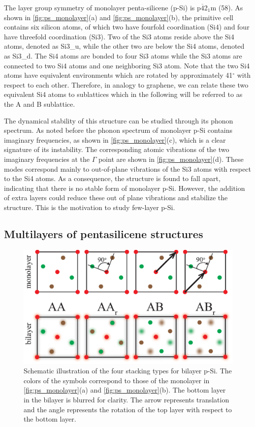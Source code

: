 The layer group symmetry of monolayer penta-silicene (p-Si) is p$\overline{4}$2$_1$m (58). As shown in \autoref{fig:ps_monolayer}(a) and \autoref{fig:ps_monolayer}(b), the primitive cell contains six silicon atoms, of which two have fourfold coordination (Si4) and four have threefold coordination (Si3). Two of the Si3 atoms reside above the Si4 atoms, denoted as Si3\_u, while the other two are below the Si4 atoms, denoted as Si3\_d. The Si4 atoms are bonded to four Si3 atoms while the Si3 atoms are connected to two Si4 atoms and one neighboring Si3 atom. Note that the two Si4 atoms have equivalent environments which are rotated by approximately 41$^{\circ}$ with respect to each other. Therefore, in analogy to graphene, we can relate these two equivalent Si4 atoms to sublattices which in the following will be referred to as the A and B sublattice.

The dynamical stability of this structure can be studied through its phonon spectrum. As noted before\cite{Ding2015,Li2015b} the phonon spectrum of monolayer p-Si contains imaginary frequencies, as shown in \autoref{fig:ps_monolayer}(c), which is a clear signature of its instability. The corresponding atomic vibrations of the two imaginary frequencies at the $\Gamma$ point are shown in \autoref{fig:ps_monolayer}(d). These modes correspond mainly to out-of-plane vibrations of the Si3 atoms with respect to the Si4 atoms. As a consequence, the structure is found to fall apart, indicating that there is no stable form of monolayer p-Si. However, the addition of extra layers could reduce these out of plane vibrations and stabilize the structure. This is the motivation to study few-layer p-Si.


\subsection{Multilayers of pentasilicene structures}\label{fews}

\begin{figure}[htb]
\centering
\includegraphics[width=0.8\linewidth]{ps_stackings.eps}%
\caption{ Schematic illustration of the four stacking types for bilayer p-Si. The colors of the symbols correspond to those of the monolayer in \autoref{fig:ps_monolayer}(a) and \autoref{fig:ps_monolayer}(b). The bottom layer in the bilayer is blurred for clarity. The arrow represents translation and the angle represents the rotation of the top layer with respect to the bottom layer. \label{fig:ps_stackings}}
\end{figure}

